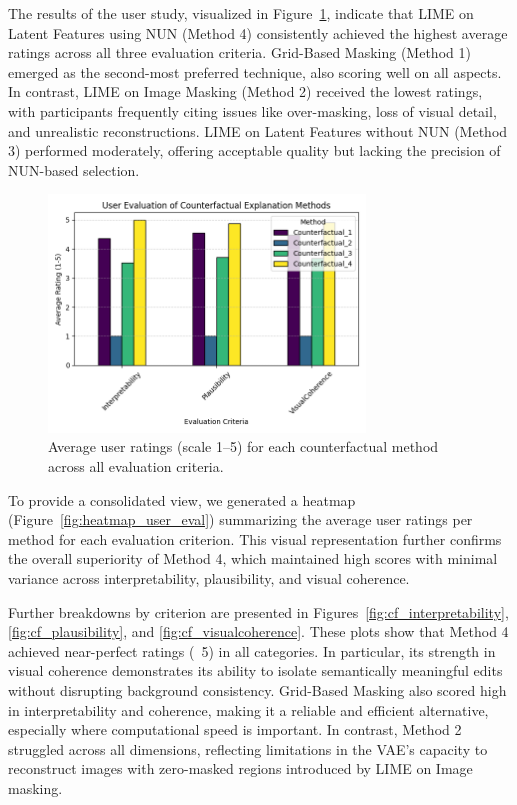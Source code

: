 The results of the user study, visualized in Figure~\ref{fig:bar_plot_user_eval}, indicate that LIME on Latent Features using NUN (Method 4) consistently achieved the highest average ratings across all three evaluation criteria. Grid-Based Masking (Method 1) emerged as the second-most preferred technique, also scoring well on all aspects. In contrast, LIME on Image Masking (Method 2) received the lowest ratings, with participants frequently citing issues like over-masking, loss of visual detail, and unrealistic reconstructions. LIME on Latent Features without NUN (Method 3) performed moderately, offering acceptable quality but lacking the precision of NUN-based selection.

\begin{figure}[htbp]
    \centering
    \includegraphics[width=0.75\textwidth]{img/human_rating_results/bar_plot_user_evaluations.png}
    \caption{Average user ratings (scale 1–5) for each counterfactual method across all evaluation criteria.}
    \label{fig:bar_plot_user_eval}
\end{figure}

To provide a consolidated view, we generated a heatmap (Figure~\ref{fig:heatmap_user_eval}) summarizing the average user ratings per method for each evaluation criterion. This visual representation further confirms the overall superiority of Method 4, which maintained high scores with minimal variance across interpretability, plausibility, and visual coherence.

Further breakdowns by criterion are presented in Figures~\ref{fig:cf_interpretability}, \ref{fig:cf_plausibility}, and \ref{fig:cf_visualcoherence}. These plots show that Method 4 achieved near-perfect ratings (~5) in all categories. In particular, its strength in visual coherence demonstrates its ability to isolate semantically meaningful edits without disrupting background consistency. Grid-Based Masking also scored high in interpretability and coherence, making it a reliable and efficient alternative, especially where computational speed is important. In contrast, Method 2 struggled across all dimensions, reflecting limitations in the VAE’s capacity to reconstruct images with zero-masked regions introduced by LIME on Image masking.

